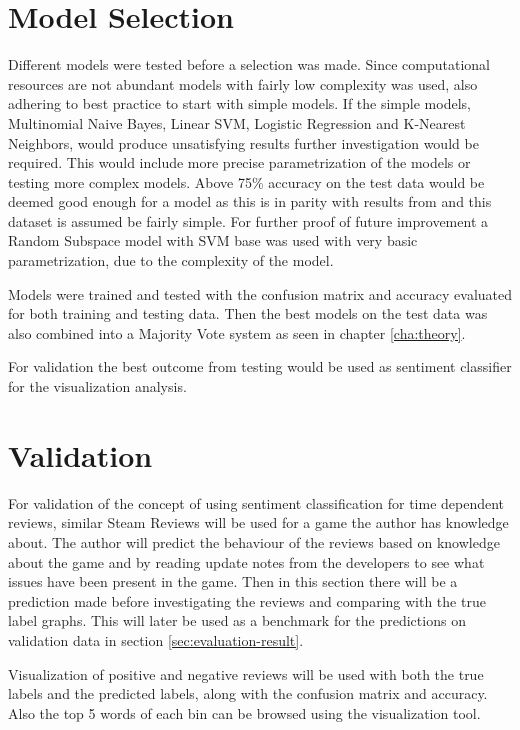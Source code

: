 \section{Model Selection}
\label{sec:model-selection}


Different models were tested before a selection was made. 
Since computational resources are not abundant models with fairly low complexity was used, also adhering to best practice to start with simple models.
If the simple models, Multinomial Naive Bayes, Linear SVM, Logistic Regression and K-Nearest Neighbors, would produce unsatisfying results further investigation would be required.
This would include more precise parametrization of the models or testing more complex models. 
Above 75\% accuracy on the test data would be deemed good enough for a model as this is in parity with results from \cite{gang-wang, rui-xia} and this dataset is assumed be fairly simple. 
For further proof of future improvement a Random Subspace model with SVM base was used with very basic parametrization, due to the complexity of the model.


Models were trained and tested with the confusion matrix and accuracy evaluated for both training and testing data.
Then the best models on the test data was also combined into a Majority Vote system as seen in chapter \autoref{cha:theory}.


For validation the best outcome from testing would be used as sentiment classifier for the visualization analysis.


\section{Validation}
\label{sec:evaluation}


For validation of the concept of using sentiment classification for time dependent reviews, similar Steam Reviews will be used for a game the author has knowledge about. 
The author will predict the behaviour of the reviews based on knowledge about the game and by reading update notes from the developers to see what issues have been present in the game. 
Then in this section there will be a prediction made before investigating the reviews and comparing with the true label graphs. 
This will later be used as a benchmark for the predictions on validation data in section \autoref{sec:evaluation-result}.


Visualization of positive and negative reviews will be used with both the true labels and the predicted labels, along with the confusion matrix and accuracy.
Also the top 5 words of each bin can be browsed using the visualization tool.


